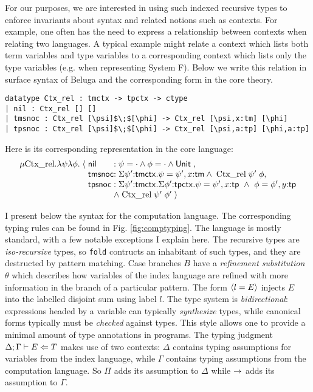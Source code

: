 \documentclass{article}
\begin{document}
For our purposes, we are interested in using such indexed recursive
types to enforce invariants about syntax and related notions such as contexts.
For example, one often has the need to express a relationship
between contexts when relating two languages. A typical example might relate a context
which lists both term variables and type variables to a corresponding
context which lists only the type variables (e.g. when representing
System F). Below we write this relation in surface syntax of Beluga and the
corresponding form in the core theory. 


\begin{lstlisting}
datatype Ctx_rel : tmctx -> tpctx -> ctype
| nil : Ctx_rel [] []
| tmsnoc : Ctx_rel [\psi]$\;$[\phi] -> Ctx_rel [\psi,x:tm] [\phi]
| tpsnoc : Ctx_rel [\psi]$\;$[\phi] -> Ctx_rel [\psi,a:tp] [\phi,a:tp]
\end{lstlisting}

Here is its corresponding representation in the core language: 
\[
\begin{array}{r@{\;}c@{\;}l@{}l}
\mu \text{Ctx\_rel}. \lambda \psi\lambda \phi. & \langle & \m{nil}\; &:  \psi
= \cdot \andalso \phi = \cdot \andalso \tunit\;, \\
&  & \m{tmsnoc} & : \Sigma \psi'{:}{\m{tmctx}}. \psi = \psi', x{:}\m{tm}
\andalso\;\text{Ctx\_rel}\;\psi'\;\phi ,\\
&  & \m{tpsnoc} & : \Sigma \psi'{:}{\m{tmctx}}. \Sigma
\phi'{:}{\m{tpctx}}. \psi = \psi', x{:}\m{tp} ~\andalso~ \phi = \phi',
y{:}\m{tp} \\
&&& \andalso\;\text{Ctx\_rel}\;\psi'\;\phi' \;\rangle 
\end{array}
\]

I present below the syntax for the computation language. The
corresponding typing rules can be found in
Fig. \ref{fig:comptyping}. The language
is mostly standard, with a few notable exceptions I explain here. The
recursive types are \emph{iso-recursive}
types, so \lstinline{fold} contructs an inhabitant of such types, and
they are destructed by pattern matching. Case branches $B$ have a
\emph{refinement substitution} $\theta$ which describes how variables
of the index language are refined with more information in the branch
of a particular pattern. The form $\langle l=E \rangle$ injects $E$ into the
labelled disjoint sum using label $l$. The type system is \emph{bidirectional}:
expressions headed by a variable can typically \emph{synthesize}
types, while canonical forms typically must be \emph{checked} against
types. This style allows one to provide a minimal amount of type
annotations in programs. The typing judgment $\Delta;\Gamma \vdash E
\Leftarrow T$ makes use of two contexts: $\Delta$ contains typing assumptions for variables from the index
language, while $\Gamma$ contains typing assumptions from the
computation language. So $\Pi$ adds its assumption to $\Delta$ while
$\rightarrow$ adds its assumption to $\Gamma$.
\end{document}
